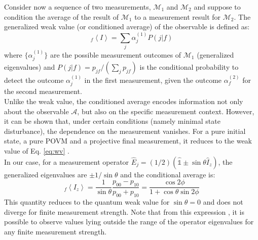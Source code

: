 Consider now a sequence of two measurements, $\mathcal{M}_1$ and $\mathcal{M}_2$ and suppose to condition the average of the result of  $\mathcal{M}_1$ to a measurement result for $\mathcal{M}_2$. The generalized weak value (or conditioned average) of the observable is defined as:
\begin{equation}
 _f \left \langle I \right \rangle = \sum_j \alpha_j^{(1)} P(j|f)
\end{equation}
where $\lbrace \alpha_j^{(1)}\rbrace$ are the possible measurement outcomes of $\mathcal{M}_1$ (generalized eigenvalues) and $P(j|f) = p_{jf}/(\sum_j p_{jf})$ is the conditional probability to detect the outcome $\alpha_j^{(1)}$ in the first measurement, given the outcome $\alpha_f^{(2)}$ for the second measurement.\\
Unlike the weak value, the conditioned average encodes information not only about the observable $\mathcal{A}$, but also on the specific measurement context. However, it can be shown \cite{Dressel_Phys.Rev.Lett._2010} that, under certain conditions (namely minimal state disturbance), the dependence on the measurement vanishes. For a pure initial state, a pure POVM and a projective final measurement, it reduces to the weak value of Eq. \ref{eq:wv} .\\
In our case, for a measurement operator $\hat{E}_j = (1/2) (\mathbb{\hat{1}} \pm \sin\theta \hat{I}_z)$, the generalized eigenvalues are $\pm 1/\sin\theta$ and the conditional average is:
\begin{equation}
\label{eq:cond_avg}
 _f \left \langle I_z \right \rangle = \frac{1}{\sin\theta} \frac{p_{00}-p_{10}}{p_{00}+p_{10}}  = \frac{\cos 2\phi}{1+ \cos \theta \sin 2\phi}
\end{equation}
This quantity reduces to the quantum weak value for $\sin\theta = 0$ and does not diverge for finite measurement strength. Note that from this expression \cite{Williams_PRL_2008,Groen_PRL_2013}, it is possible to observe values lying outside the range of the operator eigenvalues for any finite measurement strength.
\\

